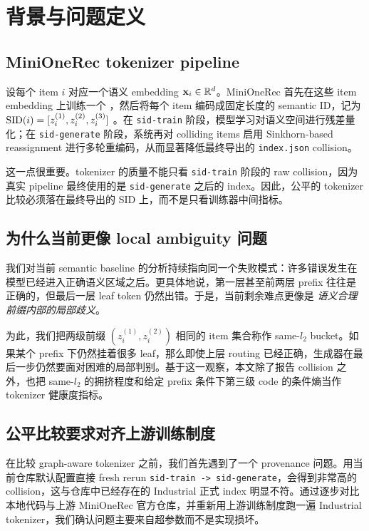 \section{背景与问题定义}
\label{sec:background}

\subsection{MiniOneRec tokenizer pipeline}

设每个 item $i$ 对应一个语义 embedding $\mathbf{x}_i \in \mathbb{R}^d$。MiniOneRec 首先在这些 item embedding 上训练一个 \rqvae{}，然后将每个 item 编码成固定长度的 semantic ID，记为 $\mathrm{SID}(i) = [z_i^{(1)}, z_i^{(2)}, z_i^{(3)}]$ \citep{kong2025minionerec,lee2022rqvae}。在 \texttt{sid-train} 阶段，模型学习对语义空间进行残差量化；在 \texttt{sid-generate} 阶段，系统再对 colliding items 启用 Sinkhorn-based reassignment 进行多轮重编码，从而显著降低最终导出的 \texttt{index.json} collision。

这一点很重要。tokenizer 的质量不能只看 \texttt{sid-train} 阶段的 raw collision，因为真实 pipeline 最终使用的是 \texttt{sid-generate} 之后的 index。因此，公平的 tokenizer 比较必须落在最终导出的 SID 上，而不是只看训练器中间指标。

\subsection{为什么当前更像 local ambiguity 问题}

我们对当前 semantic baseline 的分析持续指向同一个失败模式：许多错误发生在模型已经进入正确语义区域之后。更具体地说，第一层甚至前两层 prefix 往往是正确的，但最后一层 leaf token 仍然出错。于是，当前剩余难点更像是 \emph{语义合理前缀内部的局部歧义}。

为此，我们把两级前缀 $(z_i^{(1)}, z_i^{(2)})$ 相同的 item 集合称作 same-$l_2$ bucket。如果某个 prefix 下仍然挂着很多 leaf，那么即使上层 routing 已经正确，生成器在最后一步仍然要面对困难的局部判别。基于这一观察，本文除了报告 collision 之外，也把 same-$l_2$ 的拥挤程度和给定 prefix 条件下第三级 code 的条件熵当作 tokenizer 健康度指标。

\subsection{公平比较要求对齐上游训练制度}

在比较 graph-aware tokenizer 之前，我们首先遇到了一个 provenance 问题。用当前仓库默认配置直接 fresh rerun \texttt{sid-train -> sid-generate}，会得到非常高的 collision，这与仓库中已经存在的 Industrial 正式 index 明显不符。通过逐步对比本地代码与上游 MiniOneRec 官方仓库，并重新用上游训练制度跑一遍 Industrial tokenizer，我们确认问题主要来自超参数而不是实现损坏。

